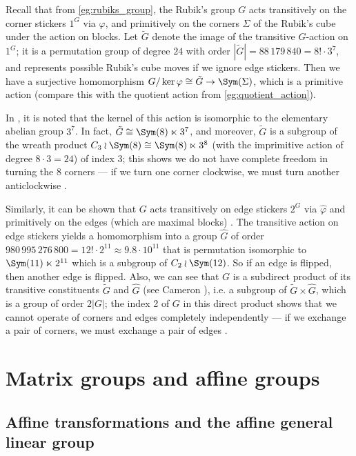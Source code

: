 \begin{example}\label{eg:rubiks_cube_wreath}
    Recall that from \autoref{eg:rubiks_group}, the Rubik's group $G$ acts transitively on the corner stickers $1^G$ via $\varphi$, and primitively on the corners $\Sigma$ of the Rubik's cube under the action on blocks. Let $\tilde G$ denote the image of the transitive $G$-action on $1^G$; it is a permutation group of degree $24$ with order $|\tilde G| = 88\,179\,840 = 8! \cdot 3^7$, and represents possible Rubik's cube moves if we ignore edge stickers. Then we have a surjective homomorphism $G/\ker\varphi \cong \tilde G \to \Sym(\Sigma)$, which is a primitive action (compare this with the quotient action from \autoref{eg:quotient_action}).

    In \cite{schonert_GAP}, it is noted that the kernel of this action is isomorphic to the elementary abelian group $3^7$. In fact, $\tilde G \cong \Sym(8) \ltimes 3^7$, and moreover, $\tilde G$ is a subgroup of the wreath product $C_3 \wr \Sym(8) \cong \Sym(8) \ltimes 3^8$ (with the imprimitive action of degree $8 \cdot 3 = 24$) of index 3; this shows we do not have complete freedom in turning the 8 corners --- if we turn one corner clockwise, we must turn another anticlockwise \cite{schonert_GAP}.

    Similarly, it can be shown that $G$ acts transitively on edge stickers $2^G$ via $\hat\varphi$ and primitively on the edges (which are maximal blocks) \cite{schonert_GAP}. The transitive action on edge stickers yields a homomorphism into a group $\hat G$ of order $980\,995\,276\,800 = 12! \cdot 2^{11} \approx 9.8 \cdot 10^{11}$ that is permutation isomorphic to $\Sym(11) \ltimes 2^{11}$ which is a subgroup of $C_2 \wr \Sym(12)$. So if an edge is flipped, then another edge is flipped. Also, we can see that $G$ is a subdirect product of its transitive constituents $\tilde G$ and $\hat G$ (see Cameron \cite{cameron_permutation_groups1999}), i.e. a subgroup of $\tilde G \times \hat G$, which is a group of order $2|G|$; the index 2 of $G$ in this direct product shows that we cannot operate of corners and edges completely independently --- if we exchange a pair of corners, we must exchange a pair of edges \cite{schonert_GAP}.
\end{example}

\section{Matrix groups and affine groups}

\subsection{Affine transformations and the affine general linear group}

